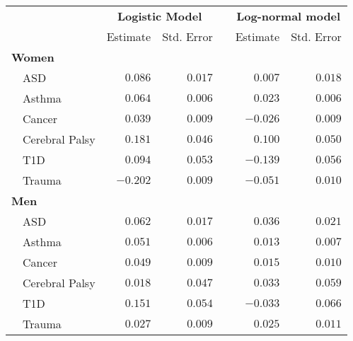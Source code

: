 \begin{table}[!tbp]
\begin{center}
\begin{tabular}{lrrcrr}
\hline\hline
\multicolumn{1}{l}{\bfseries }&\multicolumn{2}{c}{\bfseries Logistic Model}&\multicolumn{1}{c}{\bfseries }&\multicolumn{2}{c}{\bfseries Log-normal model}\tabularnewline
\cline{2-3} \cline{5-6}
\multicolumn{1}{l}{}&\multicolumn{1}{c}{Estimate}&\multicolumn{1}{c}{Std. Error}&\multicolumn{1}{c}{}&\multicolumn{1}{c}{Estimate}&\multicolumn{1}{c}{Std. Error}\tabularnewline
\hline
{\bfseries Women}&&&&&\tabularnewline
~~ASD&$ 0.086$&$0.017$&&$ 0.007$&$0.018$\tabularnewline
~~Asthma&$ 0.064$&$0.006$&&$ 0.023$&$0.006$\tabularnewline
~~Cancer&$ 0.039$&$0.009$&&$-0.026$&$0.009$\tabularnewline
~~Cerebral Palsy&$ 0.181$&$0.046$&&$ 0.100$&$0.050$\tabularnewline
~~T1D&$ 0.094$&$0.053$&&$-0.139$&$0.056$\tabularnewline
~~Trauma&$-0.202$&$0.009$&&$-0.051$&$0.010$\tabularnewline
\hline
{\bfseries Men}&&&&&\tabularnewline
~~ASD&$ 0.062$&$0.017$&&$ 0.036$&$0.021$\tabularnewline
~~Asthma&$ 0.051$&$0.006$&&$ 0.013$&$0.007$\tabularnewline
~~Cancer&$ 0.049$&$0.009$&&$ 0.015$&$0.010$\tabularnewline
~~Cerebral Palsy&$ 0.018$&$0.047$&&$ 0.033$&$0.059$\tabularnewline
~~T1D&$ 0.151$&$0.054$&&$-0.033$&$0.066$\tabularnewline
~~Trauma&$ 0.027$&$0.009$&&$ 0.025$&$0.011$\tabularnewline
\hline
\end{tabular}\end{center}
\end{table}
